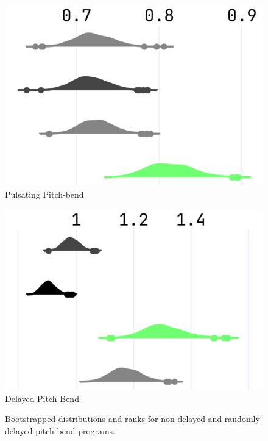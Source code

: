 \documentclass{article} %
\begin{document}
\begin{figure}[t]
\begin{minipage}[t]{\textwidth}
\begin{minipage}[t]{0.91\textwidth}
      \begin{minipage}[t]{0.31\textwidth}
        \centering
        \includegraphics[width=\linewidth]{images/npsk_ood_P_Loss_5.png}
        \vspace{0.3em}
        \footnotesize Pulsating Pitch-bend
      \end{minipage}
            \hspace{0.015\textwidth}%
      \begin{minipage}[t]{0.31\textwidth}
        \centering
        \includegraphics[width=\linewidth]{images/npsk_ood_P_Loss_4.png}
        \vspace{0.3em}
        \footnotesize Delayed Pitch-Bend
      \end{minipage}
    \end{minipage}
  \end{minipage}
  \caption{Bootstrapped distributions and ranks for non-delayed and randomly delayed pitch-bend programs.}
  \label{fig:npsk_pitch-bends}
\end{figure}
\end{document}
